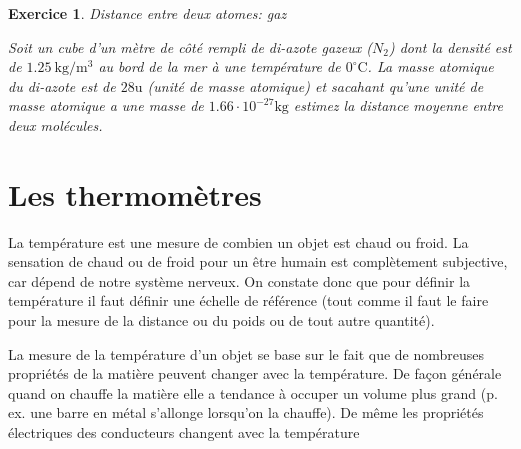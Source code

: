\documentclass[a4paper,12pt]{book}
\newtheorem{exercice}{Exercice}
\newcommand{\m}{\mathrm{m}}
\newcommand{\kg}{\mathrm{kg}}
\newcommand{\C}{\mathrm{C}}
\begin{document}
\begin{exercice}{Distance entre deux atomes: gaz}

Soit un cube d'un mètre de côté rempli de di-azote gazeux ($N_2$) dont la densité est de 
$1.25\ \kg/\m^3$ au bord de la mer à une température de $0^\circ\C$. La masse atomique du di-azote est de $28\mathrm{u}$ (unité de masse atomique) et 
sacahant qu'une unité de masse atomique a une masse de $1.66\cdot 10^{-27}\kg$ estimez
la distance moyenne entre deux molécules.
\end{exercice}

\section{Les thermomètres}

La température est une mesure de combien un objet est chaud ou froid. La sensation de chaud ou de froid pour un être humain
est complètement subjective, car dépend de notre système nerveux. On constate donc que pour définir la température il faut définir une 
échelle de référence (tout comme il faut le faire pour la mesure de la distance ou du poids ou de tout autre quantité).

La mesure de la température d'un objet se base sur le fait que de nombreuses propriétés
de la matière peuvent changer avec la température. De façon générale quand on chauffe la matière elle a tendance à occuper un volume plus grand (p. ex. une barre en métal s'allonge lorsqu'on la chauffe). De même les propriétés électriques des conducteurs changent avec la température
\end{document}

